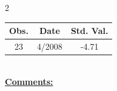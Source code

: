 
\bigskip 
\begin{multicols}{2}{ 
\begin{tabular}{ccc}
\hline  Obs.  &  Date &  Std. Val. \\ 
\hline 
                       23 &        4/2008 &         -4.71 \vspace{-.12in} \\  
 \end{tabular} 
\\ 
 \columnbreak 
 \singlespacing 
 \underline{\textbf{Comments:}} \\ 
 \bigskip       

 } 
\end{multicols} 
